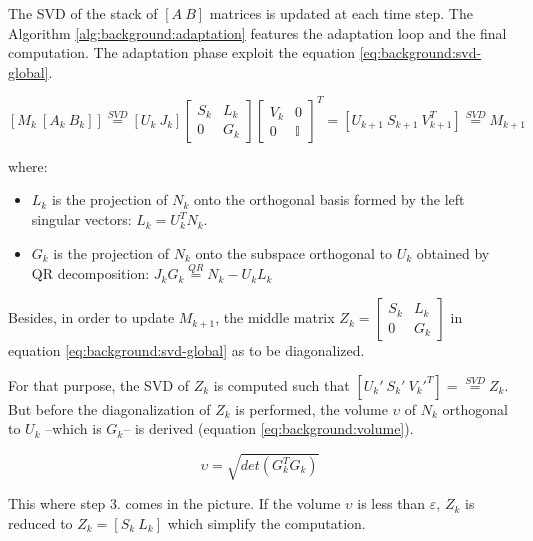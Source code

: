 \documentclass[/home/francois/latex/report/main.tex]{subfiles}
\begin{document}
The \ac{SVD} of the stack of $[A \ B]$ matrices is updated at each time step. The Algorithm \ref{alg:background:adaptation} features the adaptation loop and the final computation. The adaptation phase exploit the equation \ref{eq:background:svd-global}.

\begin{equation}
  \label{eq:background:svd-global}
  [M_k \ [A_k \ B_k]] \overset{SVD}{=} [U_k \ J_k]
  \begin{bmatrix}
  S_k &  L_k \\
  0 & G_k
\end{bmatrix}
  \begin{bmatrix}
  V_k &  0 \\
  0 & \mathbb{I}
\end{bmatrix}^T = [U_{k+1} \ S_{k+1} \ V_{k+1}^T]
 \overset{SVD}{=} M_{k+1}
\end{equation}

where:
\begin{itemize}
  \item $L_k$ is the projection of $N_k$ onto the orthogonal basis formed by the left singular vectors: $L_k = U_k^T N_k$.
  \item $G_k$ is the projection of $N_k$ onto the subspace orthogonal to $U_k$ obtained by QR decomposition: $J_k G_k \overset{QR}{=} N_k - U_k L_k$
\end{itemize}



Besides, in order to update $M_{k+1}$, the middle matrix $Z_k=
\begin{bmatrix}
  S_k &  L_k \\
  0 & G_k
\end{bmatrix}$
in equation \ref{eq:background:svd-global} as to be diagonalized.

For that purpose, the \ac{SVD} of $Z_k$ is computed such that $[U_{k}' \ S_{k}' \ V_{k}'^T] = \overset{SVD}{=} Z_k$. But before the diagonalization of $Z_k$ is performed, the volume $\upsilon$ of $N_k$ orthogonal to $U_k$ –which is $G_k$– is derived (equation \ref{eq:background:volume}).

\begin{equation}
  \label{eq:background:volume}
  \upsilon = \sqrt{det(G_k^T G_k)}
\end{equation}

This where step 3. comes in the picture. If the volume $\upsilon$ is less than $\varepsilon$, $Z_k$ is reduced to $Z_k = [S_k \ L_k]$ which simplify the computation.
\end{document}
